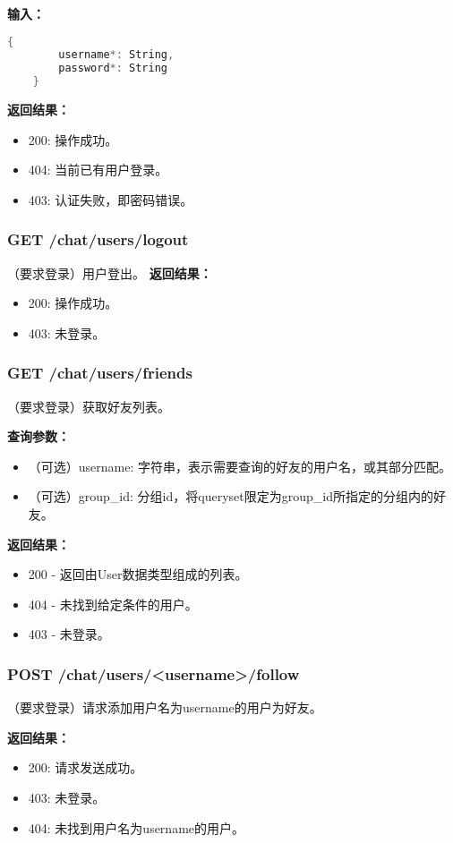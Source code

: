 \textbf{输入：}
\begin{lstlisting}[language=C]
    {
        username*: String,
        password*: String
    }
\end{lstlisting}

\textbf{返回结果：}
\begin{itemize}
    \item 200: 操作成功。
    \item 404: 当前已有用户登录。
    \item 403: 认证失败，即密码错误。
\end{itemize}

\subsubsection{\textbf{GET} /chat/users/logout}
（要求登录）用户登出。
\textbf{返回结果：}
\begin{itemize}
    \item 200: 操作成功。
    \item 403: 未登录。
\end{itemize}

\subsubsection{\textbf{GET} /chat/users/friends}
（要求登录）获取好友列表。

\textbf{查询参数：}
\begin{itemize}
    \item （可选）username: 字符串，表示需要查询的好友的用户名，或其部分匹配。
    \item （可选）group\_id: 分组id，将queryset限定为group\_id所指定的分组内的好友。
\end{itemize}

\textbf{返回结果：}
\begin{itemize}
    \item 200 - 返回由User数据类型组成的列表。
    \item 404 - 未找到给定条件的用户。
    \item 403 - 未登录。
\end{itemize}
    

\subsubsection{\textbf{POST} /chat/users/<username>/follow}
（要求登录）请求添加用户名为username的用户为好友。

\textbf{返回结果：}
\begin{itemize}
    \item 200: 请求发送成功。
    \item 403: 未登录。
    \item 404: 未找到用户名为username的用户。
\end{itemize}

